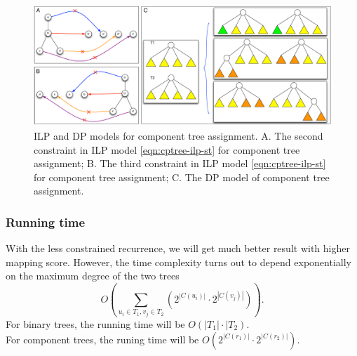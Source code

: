 \begin{figure}[htbp]
\centering
\includegraphics[width=1.0\textwidth]{images/treeassign_cptree}
\caption[ILP and DP models for component tree assignment]{ILP and DP models for component tree assignment. A. The second constraint in ILP model \ref{eqn:cptree-ilp-st} for component tree assignment; B. The third constraint in ILP model \ref{eqn:cptree-ilp-st} for component tree assignment; C. The DP model of component tree assignment.}
\label{fig:treeassign-cptree}
\end{figure}

\subsubsection{Running time}
With the less constrained recurrence, we will get much better result with higher mapping score. However, the time complexity turns out to depend exponentially on the maximum degree of the two trees
\begin{equation*} \label{eqn:lcdp-time}
O\left(\sum_{u_i \in T_1, v_j \in T_2}(2^{|C(u_i)|}\cdot 2^{|C(v_j)|})\right).
\end{equation*}
For binary trees, the running time will be
$O(|T_1|\cdot|T_2)$. \\
For component trees, the runing time will be 
$O\left(2^{|C(r_1)|}\cdot2^{|C(r_2)|}\right)$. \\
